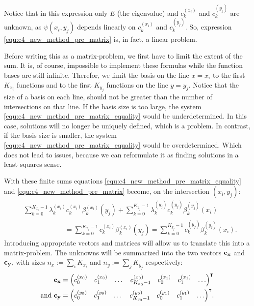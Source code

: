 Notice that in this expression only $E$ (the eigenvalue) and $c_k^{(x_i)}$ and $c_k^{(y_j)}$ are unknown, as $\psi(x_i, y_j)$ depends linearly on $c_k^{(x_i)}$ and $c_k^{(y_j)}$. So, expression \eqref{equ:c4_new_method_pre_matrix} is, in fact, a linear problem.

Before writing this as a matrix-problem, we first have to limit the extent of the sum. It is, of course, impossible to implement these formulas while the function bases are still infinite. Therefor, we limit the basis on the line $x = x_i$ to the first $K_{x_i}$ functions and to the first $K_{y_j}$ functions on the line $y = y_j$. Notice that the size of a basis on each line, should not be greater than the number of intersections on that line. If the basis size is too large, the system \eqref{equ:c4_new_method_pre_matrix_equality} would be underdetermined. In this case, solutions will no longer be uniquely defined, which is a problem. In contrast, if the basis size is smaller, the system \eqref{equ:c4_new_method_pre_matrix_equality} would be overdetermined. Which does not lead to issues, because we can reformulate it as finding solutions in a least squares sense.

With these finite sums equations \eqref{equ:c4_new_method_pre_matrix_equality} and \eqref{equ:c4_new_method_pre_matrix} become, on the intersection $(x_i, y_j)$:
\begin{align}
     & \sum_{k=0}^{K_{x_i}-1} \lambda_k^{(x_i)} c_k^{(x_i)} \beta^{(x_i)}_k(y_j) + \sum_{k=0}^{K_{y_j}-1} \lambda_k^{(y_j)} c_k^{(y_j)} \beta_k^{(y_j)}(x_i)\nonumber                                  \\
     & \qquad\qquad\qquad     = \sum_{k=0}^{K_{x_i}-1} c_k^{(x_i)} \beta_k^{(x_i)}(y_j) = \sum_{k=0}^{K_{y_j}-1} c_k^{(y_j)} \beta_k^{(y_j)}(x_i) \text{.}\label{equ:c4_new_method_pre_matrix_unified}
\end{align}
Introducing appropriate vectors and matrices will allow us to translate this into a matrix-problem. The unknowns will be summarized into the two vectors $\vb{c_x}$ and $\vb{c_y}$, with sizes $n_x := \sum_i K_{x_i}$ and $n_y := \sum_j K_{y_j}$ respectively:
\begin{align*}
    \vb{c_x}            & = {\begin{pmatrix} c_0^{(x_0)} & c_1^{(x_0)} & \dots & c_{K_{x_0}-1}^{(x_0)} & c_0^{(x_1)} & c_1^{(x_1)} & \dots \end{pmatrix}}^\intercal         \\
    \text{and }\vb{c_y} & = {\begin{pmatrix} c_0^{(y_0)} & c_1^{(y_0)} & \dots & c_{K_{y_0}-1}^{(y_0)} & c_0^{(y_1)} & c_1^{(y_1)} & \dots \end{pmatrix}}^\intercal\text{.}
\end{align*}

